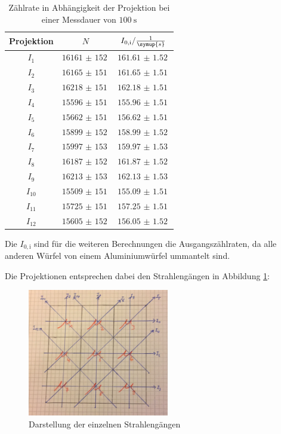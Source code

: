 \begin{table}[H]
  \centering
  \caption{Zählrate in Abhängigkeit der Projektion bei einer Messdauer von $\SI{100}{\second}$ }
  \label{tab:w1}
  \begin{tabular}{c c c}
    \toprule
    Projektion & $N$ & $I_{0,\mathrm{i}} / \frac{1}{\symup{s}}$  \\
    \midrule
        $I_1$    & $\SI{16161(152)}{}$ & $\SI{161.61(152)}{}$    \\
        $I_2$    & $\SI{16165(151)}{}$ & $\SI{161.65(151)}{}$    \\
        $I_3$    & $\SI{16218(151)}{}$ & $\SI{162.18(151)}{}$    \\
        $I_4$    & $\SI{15596(151)}{}$ & $\SI{155.96(151)}{}$    \\
        $I_5$    & $\SI{15662(151)}{}$ & $\SI{156.62(151)}{}$    \\
        $I_6$    & $\SI{15899(152)}{}$ & $\SI{158.99(152)}{}$    \\
        $I_7$    & $\SI{15997(153)}{}$ & $\SI{159.97(153)}{}$    \\
        $I_8$    & $\SI{16187(152)}{}$ & $\SI{161.87(152)}{}$    \\
        $I_9$    & $\SI{16213(153)}{}$ & $\SI{162.13(153)}{}$    \\
        $I_{10}$ & $\SI{15509(151)}{}$ & $\SI{155.09(151)}{}$   \\
        $I_{11}$ & $\SI{15725(151)}{}$ & $\SI{157.25(151)}{}$    \\
        $I_{12}$ & $\SI{15605(152)}{}$ & $\SI{156.05(152)}{}$    \\
    \bottomrule
  \end{tabular}
\end{table}

Die $I_{0,\mathrm{i}}$ sind für die weiteren Berechnungen die Ausgangszählraten,
da alle anderen Würfel von einem Aluminiumwürfel ummantelt sind.

Die Projektionen entsprechen dabei den Strahlengängen in Abbildung \ref{fig:pro}:

\begin{figure}[H]
  \centering
  \includegraphics[width=0.55\textwidth]{projektionen.pdf}
  \caption{Darstellung der einzelnen Strahlengängen}
  \label{fig:pro}
\end{figure}


